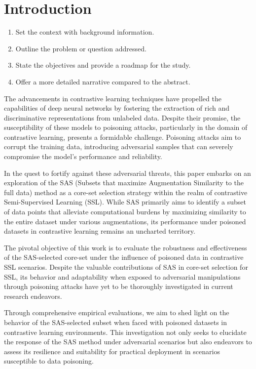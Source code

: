 \section{Introduction}

\begin{enumerate}
    \item Set the context with background information.
    \item Outline the problem or question addressed.
    \item State the objectives and provide a roadmap for the study.
    \item Offer a more detailed narrative compared to the abstract.
\end{enumerate}

The advancements in contrastive learning techniques have propelled the capabilities of deep neural networks by fostering the extraction of rich and discriminative representations from unlabeled data. Despite their promise, the susceptibility of these models to poisoning attacks, particularly in the domain of contrastive learning, presents a formidable challenge. Poisoning attacks aim to corrupt the training data, introducing adversarial samples that can severely compromise the model's performance and reliability.

In the quest to fortify against these adversarial threats, this paper embarks on an exploration of the SAS (Subsets that maximize Augmentation Similarity to the full data) method as a core-set selection strategy within the realm of contrastive Semi-Supervised Learning (SSL). While SAS primarily aims to identify a subset of data points that alleviate computational burdens by maximizing similarity to the entire dataset under various augmentations, its performance under poisoned datasets in contrastive learning remains an uncharted territory.

The pivotal objective of this work is to evaluate the robustness and effectiveness of the SAS-selected core-set under the influence of poisoned data in contrastive SSL scenarios. Despite the valuable contributions of SAS in core-set selection for SSL, its behavior and adaptability when exposed to adversarial manipulations through poisoning attacks have yet to be thoroughly investigated in current research endeavors.

Through comprehensive empirical evaluations, we aim to shed light on the behavior of the SAS-selected subset when faced with poisoned datasets in contrastive learning environments. This investigation not only seeks to elucidate the response of the SAS method under adversarial scenarios but also endeavors to assess its resilience and suitability for practical deployment in scenarios susceptible to data poisoning.

